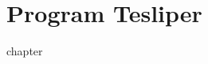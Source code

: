 \documentclass[
  a4paper,
  twoside,
  justified,
  nobib,
  marginals=raggedright,
]{tufte-book}
\begin{document}
\chapter{Program Tesliper}\label{chapter:tesliper}

{chapter}

\backmatter

\end{document}

